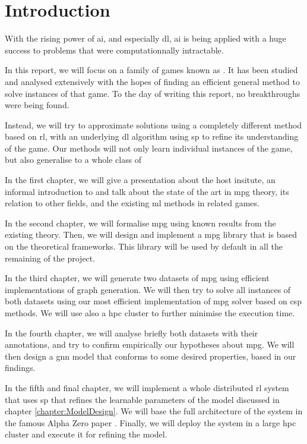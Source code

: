 \chapter*{Introduction}


With the rising power of \acrfull{ai}, and especially \acrfull{dl}, \acrshort{ai} is being applied with a huge success to problems that were computationnally intractable.

In this report, we will focus on a family of games known as . It has been studied and analysed extensively with the hopes of finding an efficient general method to solve instances of that game. To the day of writing this report, no breakthroughs were being found. 

Instead, we will try to approximate solutions using a completely different method based on \acrfull{rl}, with an underlying \acrshort{dl} algorithm using \acrfull{sp} to refine its understanding of the game. Our methods will not only learn individual instances of the game, but also generalise to a whole class of 

In the first chapter, we will give a presentation about the host insitute, an informal introduction to  and talk about the state of the art in \acrshort{mpg} theory, its relation to other fields, and the existing \acrfull{ml} methods in related games.

In the second chapter, we will formalise \acrshort{mpg} using known results from the existing theory. Then, we will design and implement a \acrshort{mpg} library that is based on the theoretical frameworks. This library will be used by default in all the remaining of the project.

In the third chapter, we will generate two datasets of \acrshort{mpg} using efficient implementations of graph generation. We will then try to solve all instances of both datasets using our most efficient implementation of \acrshort{mpg} solver based on \acrfull{csp} methods.  We will use also a \acrfull{hpc} cluster to further minimise the execution time.

In the fourth chapter, we will analyse briefly both datasets with their annotations, and try to confirm empirically our hypotheses about \acrshort{mpg}. We will then design a \acrshort{gnn} model that conforms to some desired properties, based in our findings.

In the fifth and final chapter, we will implement a whole distributed \acrshort{rl} system that uses \acrfull{sp} that refines the learnable parameters of the model discussed in chapter \ref{chapter:ModelDesign}.  We will base the full architecture of the system in the famous Alpha Zero paper \cite{AlphaZero}. Finally, we will deploy the system in a large \acrshort{hpc} cluster and execute it for refining the model.

